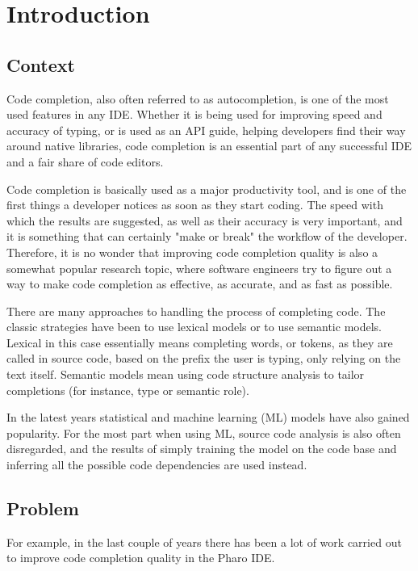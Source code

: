 \chapter{Introduction}
\label{chap:Introduction}

\section{Context}
Code completion, also often referred to as autocompletion, is one of the most used features in any IDE. Whether it is being used for improving speed and accuracy of typing, or is used as an API guide, helping developers find their way around native libraries, code completion is an essential part of any successful IDE and a fair share of code editors.

Code completion is basically used as a major productivity tool, and is one of the first things a developer notices as soon as they start coding. The speed with which the results are suggested, as well as their accuracy is very important, and it is something that can certainly "make or break" the workflow of the developer. Therefore, it is no wonder that improving code completion quality is also a somewhat popular research topic, where software engineers try to figure out a way to make code completion as effective, as accurate, and as fast as possible.

There are many approaches to handling the process of completing code. The classic strategies have been to use lexical models or to use semantic models. Lexical in this case essentially means completing words, or tokens, as they are called in source code, based on the prefix the user is typing, only relying on the text itself. Semantic models mean using code structure analysis to tailor completions (for instance, type or semantic role).

In the latest years statistical and machine learning (ML) models have also gained popularity. For the most part when using ML, source code analysis is also often disregarded, and the results of simply training the model on the code base and inferring all the possible code dependencies are used instead.

\section{Problem}
\label{sec:Introduction-Problem}
For example, in the last couple of years there has been a lot of work carried out to improve code completion quality in the Pharo IDE.

